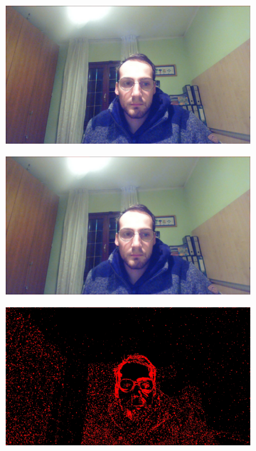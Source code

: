 \documentclass[paper=a4, fontsize=10pt]{scrartcl}	%
\begin{document}
\begin{figure}[H]
\begin{subfigure}{0.2\textwidth}
	\end{subfigure}%
	\begin{subfigure}{0.2\textwidth}
		\includegraphics[width=\linewidth]{images/heatmap/img_gaus/img_man_g6.jpg}
	\end{subfigure}%
	\begin{subfigure}{0.2\textwidth}
		\includegraphics[width=\linewidth]{images/heatmap/img_gaus/img_man_g7.jpg}
	\end{subfigure}
	\begin{subfigure}{0.2\textwidth}
		\includegraphics[width=\linewidth]{images/heatmap/img_gaus/img_man_red_g3.jpg}

\end{subfigure}
\end{figure}
\end{document}

